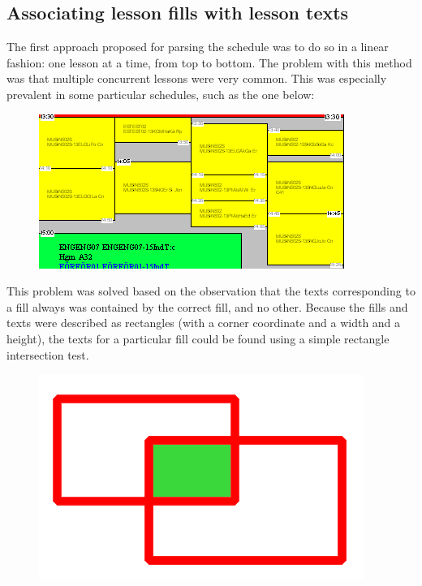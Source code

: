 \documentclass{article}
\begin{document}
	\subsection{Associating lesson fills with lesson texts}
	The first approach proposed for parsing the schedule was to do so in a linear fashion: one lesson at a time, from top to bottom. The problem with this method was that multiple concurrent lessons were very common. This was especially prevalent in some particular schedules, such as the one below:
	
	\begin{figure}[h]%
		\centering
		\includegraphics[width=0.7\linewidth]{images/schedule-13esmu}
		\caption{}
		\label{fig:schedule-13esmu}
	\end{figure}
	
	This problem was solved based on the observation that the texts corresponding to a fill always was contained by the correct fill, and no other. Because the fills and texts were described as rectangles (with a corner coordinate and a width and a height), the texts for a particular fill could be found using a simple rectangle intersection test.
	
	\begin{figure}[!h]
		\centering
		\includegraphics[width=0.1\linewidth]{images/rectangles-intersecting}
		\caption{}
		\label{fig:rectangles-intersecting}
	\end{figure}
	
\end{document}
